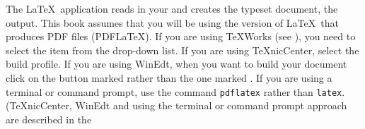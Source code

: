   The \LaTeX\ application reads in your  
  and creates the typeset document, the
  \gls*{output}. This book assumes that you will be using the
  version of \LaTeX\ that produces PDF files (PDF\LaTeX). If you are
  using TeXWorks (see ), you need to select the
  \mbox{} item from the drop-down list. If you are using
  TeXnicCenter, select the \mbox{} build
  profile. If you are
  using WinEdt, when you want to build your document click on the
  button marked  rather than the one marked .
  If you are using a terminal or command prompt, use the command
  \texttt{pdflatex} rather than \texttt{latex}. (TeXnicCenter, WinEdt
  and using the terminal or command prompt approach are described in
  the 
